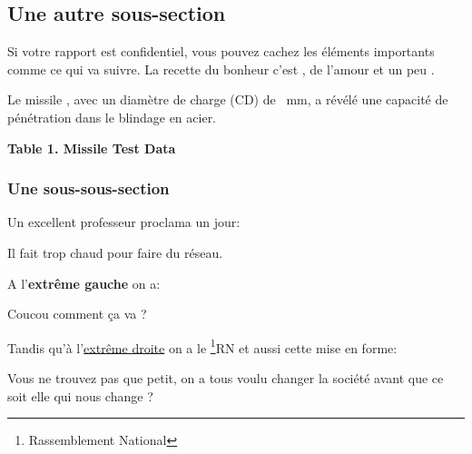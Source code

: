 \subsection{Une autre sous-section}
Si votre rapport est confidentiel, vous pouvez cachez les éléments importants comme ce qui va suivre.
La recette du bonheur c'est , de l'amour et un peu .

Le missile , avec un diamètre de charge (CD) de
~mm, a révélé une capacité de pénétration dans le blindage
en acier.
\begin{table}[ht]
    \begin{center}
        \textbf{Table 1.  Missile Test Data}\\
        \end{center}
\end{table}


\subsubsection{Une sous-sous-section}
Un excellent professeur proclama un jour:
\begin{center}
Il fait trop chaud pour faire du réseau.
\end{center}

A l'\textbf{extrême gauche} on a:
\begin{flushleft}
    Coucou comment ça va ?
\end{flushleft}

Tandis qu'à l'\underline{extrême droite} on a le \href{https://rassemblementnational.fr/}{\footnote{Rassemblement National}{RN}} et aussi cette mise en forme:

\begin{flushright}
    Vous ne trouvez pas que petit, on a tous voulu changer la société avant que ce soit elle qui nous change ?
\end{flushright}

